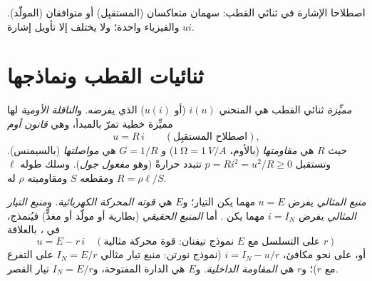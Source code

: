 \begin{omfigure}

{\small اصطلاحا الإشارة في ثنائي القطب: سهمان متعاكسان
(المستقبِل) أو متوافقان (المولّد). والفيزياء واحدة؛ ولا يختلف إلا
تأويل إشارة $ui$.}
\end{omfigure}

\section{ثنائيات القطب ونماذجها}

\begin{definition}\label{def:b1:dc-circuits:resistor}
\emph{مميِّزة} ثنائي القطب هي المنحني $i(u)$ (أو $u(i)$)
الذي يفرضه. و\emph{الناقلة الأومية} لها مميِّزة خطية تمرّ بالمبدأ،
وهي \emph{قانون أوم}
\[
u = R\,i \qquad (\text{اصطلاح المستقبِل}),
\]
حيث $R$ هي \emph{مقاومتها} (بالأوم، $\qty{1}{\ohm} = \qty{1}{V/A}$) و
$G = 1/R$ هي \emph{مواصلتها} (بالسيمنس). وتستقبل $p = Ri^2 =
u^2/R \geq 0$ تتبدد حرارةً (وهو \emph{مفعول جول}). وسلك
طوله $\ell$ ومقطعه $S$ ومقاوميته $\rho$ له
$R = \rho\ell/S$.
\end{definition}

\begin{definition}\label{def:b1:dc-circuits:sources}
\emph{منبع  المثالي} يفرض $u = E$ مهما يكن التيار؛
و$E$ هي \emph{قوته المحركة الكهربائية}. و\emph{منبع التيار
المثالي} يفرض $i = I_N$ مهما يكن . أما \emph{المنبع الحقيقي}
(بطارية أو مولّد أو مغذٍّ) فيُنمذج، في ، بالعلاقة
\[
u = E - r\,i \quad (\text{نموذج تيفنان: قوة محركة مثالية } E \text{ على التسلسل مع } r)
\]
أو، على نحو مكافئ، $i = I_N - u/r$ (نموذج نورتن: منبع تيار
مثالي $I_N = E/r$ على التفرع مع $r$)؛ و$r$ هي \emph{المقاومة
الداخلية}. و$E$ هي  الدارة المفتوحة، و$I_N = E/r$ تيار
القصر.
\end{definition}

